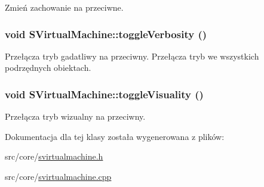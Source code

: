 Zmień zachowanie na przeciwne. \hypertarget{classSVirtualMachine_d099907121223d24b1a599a3518cf3b0}{
\subsubsection[{toggleVerbosity}]{\setlength{\rightskip}{0pt plus 5cm}void SVirtualMachine::toggleVerbosity ()}}
\label{classSVirtualMachine_d099907121223d24b1a599a3518cf3b0}


Przełącza tryb gadatliwy na przeciwny. Przełącza tryb we wszystkich podrzędnych obiektach. \hypertarget{classSVirtualMachine_ebee297cd2a5c3c572090315481e5024}{
\subsubsection[{toggleVisuality}]{\setlength{\rightskip}{0pt plus 5cm}void SVirtualMachine::toggleVisuality ()}}
\label{classSVirtualMachine_ebee297cd2a5c3c572090315481e5024}


Przełącza tryb wizualny na przeciwny. 

Dokumentacja dla tej klasy została wygenerowana z plików:\begin{CompactItemize}
\item 
src/core/\hyperlink{svirtualmachine_8h}{svirtualmachine.h}\item 
src/core/\hyperlink{svirtualmachine_8cpp}{svirtualmachine.cpp}\end{CompactItemize}
